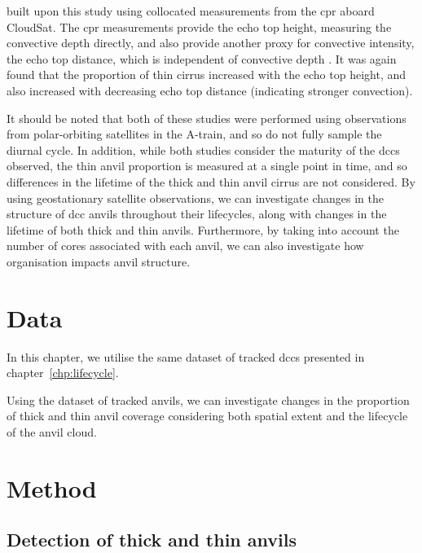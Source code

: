 \citet{takahashi_relationships_2017} built upon this study using collocated measurements from the \acrfull{cpr} aboard CloudSat.
The \acrshort{cpr} measurements provide the echo top height, measuring the convective depth directly, and also provide another proxy for convective intensity, the echo top distance, which is independent of convective depth \citep{takahashi_characterizing_2014}.
It was again found that the proportion of thin cirrus increased with the echo top height, and also increased with decreasing echo top distance (indicating stronger convection).

It should be noted that both of these studies were performed using observations from polar-orbiting satellites in the A-train, and so do not fully sample the diurnal cycle.
In addition, while both studies consider the maturity of the \acrshort{dcc}s observed, the thin anvil proportion is measured at a single point in time, and so differences in the lifetime of the thick and thin anvil cirrus are not considered.
By using geostationary satellite observations, we can investigate changes in the structure of \acrshort{dcc} anvils throughout their lifecycles, along with changes in the lifetime of both thick and thin anvils.
Furthermore, by taking into account the number of cores associated with each anvil, we can also investigate how organisation impacts anvil structure.


\section{Data}

In this chapter, we utilise the same dataset of tracked \acrshort{dcc}s presented in chapter~\ref{chp:lifecycle}.

Using the dataset of tracked anvils, we can investigate changes in the proportion of thick and thin anvil coverage considering both spatial extent and the lifecycle of the anvil cloud.


\section{Method}


\subsection{Detection of thick and thin anvils}

